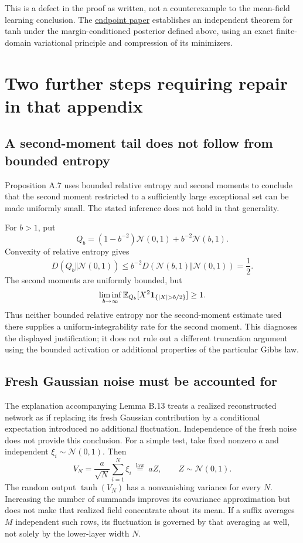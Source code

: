 \documentclass[11pt]{article}
\begin{document}
This is a defect in the proof as written, not a counterexample to the mean-field learning conclusion. The \href{https://github.com/kaarelh/AI-works/blob/main/neural-network-generalization/side-results/gamma-ge1-endpoint/paper.pdf}{endpoint paper} establishes an independent theorem for tanh under the margin-conditioned posterior defined above, using an exact finite-domain variational principle and compression of its minimizers.

\section{Two further steps requiring repair in that appendix}
\subsection{A second-moment tail does not follow from bounded entropy}
Proposition A.7 uses bounded relative entropy and second moments to conclude that the second moment restricted to a sufficiently large exceptional set can be made uniformly small. The stated inference does not hold in that generality.

For $b>1$, put
\[
 Q_b=(1-b^{-2})\mathcal N(0,1)+b^{-2}\mathcal N(b,1).
\]
Convexity of relative entropy gives
\[
 D(Q_b\Vert\mathcal N(0,1))\leq
 b^{-2}D(\mathcal N(b,1)\Vert\mathcal N(0,1))=\frac12.
\]
The second moments are uniformly bounded, but
\[
 \liminf_{b\to\infty}
 \mathbb E_{Q_b}[X^2{\bf1}_{\{|X|>b/2\}}]\geq1.
\]
Thus neither bounded relative entropy nor the second-moment estimate used there supplies a uniform-integrability rate for the second moment. This diagnoses the displayed justification; it does not rule out a different truncation argument using the bounded activation or additional properties of the particular Gibbs law.

\subsection{Fresh Gaussian noise must be accounted for}
The explanation accompanying Lemma B.13 treats a realized reconstructed network as if replacing its fresh Gaussian contribution by a conditional expectation introduced no additional fluctuation. Independence of the fresh noise does not provide this conclusion. For a simple test, take fixed nonzero $a$ and independent $\xi_i\sim\mathcal N(0,1)$. Then
\[
 V_N=\frac a{\sqrt N}\sum_{i=1}^N\xi_i
 \ \stackrel{\mathrm{law}}=\ aZ,\qquad Z\sim\mathcal N(0,1).
\]
The random output $\tanh(V_N)$ has a nonvanishing variance for every $N$. Increasing the number of summands improves its covariance approximation but does not make that realized field concentrate about its mean. If a suffix averages $M$ independent such rows, its fluctuation is governed by that averaging as well, not solely by the lower-layer width $N$.
\end{document}
